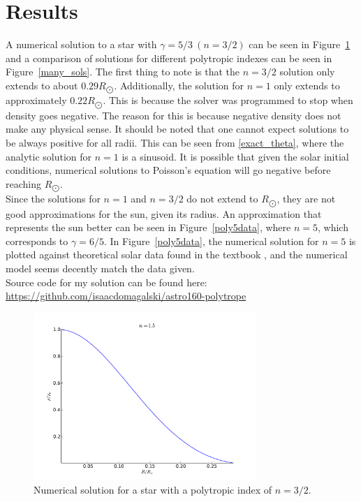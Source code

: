 \documentclass[11pt,letterpaper]{article}
\begin{document}
\section{Results}

A numerical solution to a star with $\gamma = 5/3\ \left(n = 3/2\right)$ can be
seen in Figure~\ref{poly15} and a comparison of solutions for different
polytropic indexes can be seen in Figure~\ref{many_sols}.
The first thing to note is that the $n = 3/2$ solution only extends to about
$0.29 R_{\bigodot}$. Additionally, the solution for $n = 1$ only extends to
approximately $0.22 R_{\bigodot}$. This is because the solver was programmed to
stop when density goes negative. The reason for this is because negative density
does not make any physical sense. It should be noted that one cannot expect
solutions to be always positive for all radii. This can be seen from
\eqref{exact_theta}, where the analytic solution for $n = 1$ is a sinusoid. It
is possible that given the solar initial conditions, numerical solutions to
Poisson's equation will go negative before reaching $R_{\bigodot}.$\\

Since the solutions for $n = 1$ and $n = 3/2$ do not extend to $R_{\bigodot}$,
they are not good approximations for the sun, given its radius. An approximation
that represents the sun better can be seen in Figure~\ref{poly5data}, where
$n = 5$, which corresponds to $\gamma = 6/5$. In Figure~\ref{poly5data}, the
numerical solution for $n = 5$ is plotted against theoretical solar data found
in the textbook \cite{textbook}, and the numerical model seems decently match
the data given.\\

Source code for my solution can be found here:\\
\url{https://github.com/isaacdomagalski/astro160-polytrope}

\begin{figure}
    \centering
    \includegraphics[width=0.75\textwidth]{figures/poly1_5.pdf}
    \caption{Numerical solution for a star with a polytropic index of $n=3/2$.}
    \label{poly15}
\end{figure}
\end{document}

